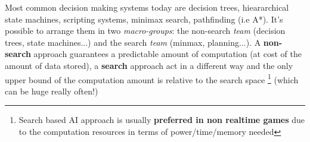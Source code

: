 Most common decision making systems today are decision trees, hieararchical state machines, scripting systems, minimax search, pathfinding (i.e A*). It's possible to arrange them in two \textit{macro-groups}: the non-search \textit{team} (decision trees, state machines...) and the search \textit{team} (minmax, planning...).
A \textbf{non-search} approach guarantees a predictable amount of computation 	(at cost of the amount of data stored), a \textbf{search} approach act in a different way and the only upper bound of the computation amount is relative to the search space
\footnote{Search based AI approach is usually \textbf{preferred in non realtime games} due to the computation resources in terms of power/time/memory needed} (which can be huge really often!)
